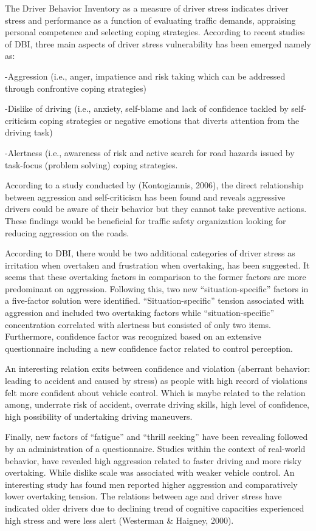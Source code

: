 \documentclass[
11pt, %
oneside, %
english, %
singlespacing, %
]{macthesis} %
\begin{document}
The Driver Behavior Inventory as a measure of driver stress indicates driver stress and performance as a function of evaluating traffic demands, appraising personal competence and selecting coping strategies. According to recent studies of DBI, three main aspects of driver stress vulnerability has been emerged namely as:

-Aggression (i.e., anger, impatience and risk taking which can be addressed through confrontive coping strategies)

-Dislike of driving (i.e., anxiety, self-blame and lack of confidence tackled by self-criticism coping strategies or negative emotions that diverts attention from the driving task)

-Alertness (i.e., awareness of risk and active search for road hazards issued by task-focus (problem solving) coping strategies.

According to a study conducted by (Kontogiannis, 2006), the direct relationship between aggression and self-criticism has been found and reveals aggressive drivers could be aware of their behavior but they cannot take preventive actions. These findings would be beneficial for traffic safety organization looking for reducing aggression on the roads.

According to DBI, there would be two additional categories of driver stress as irritation when overtaken and frustration when overtaking, has been suggested. It seems that these overtaking factors in comparison to the former factors are more predominant on aggression. Following this, two new ``situation-specific'' factors in a five-factor solution were identified. ``Situation-specific'' tension associated with aggression and included two overtaking factors while ``situation-specific'' concentration correlated with alertness but consisted of only two items. Furthermore, confidence factor was recognized based on an extensive questionnaire including a new confidence factor related to control perception.

An interesting relation exits between confidence and violation (aberrant behavior: leading to accident and caused by stress) as people with high record of violations felt more confident about vehicle control. Which is maybe related to the relation among, underrate risk of accident, overrate driving skills, high level of confidence, high possibility of undertaking driving maneuvers.

Finally, new factors of ``fatigue'' and ``thrill seeking'' have been revealing followed by an administration of a questionnaire. Studies within the context of real-world behavior, have revealed high aggression related to faster driving and more risky overtaking. While dislike scale was associated with weaker vehicle control. An interesting study has found men reported higher aggression and comparatively lower overtaking tension. The relations between age and driver stress have indicated older drivers due to declining trend of cognitive capacities experienced high stress and were less alert (Westerman \& Haigney, 2000).
\end{document}
